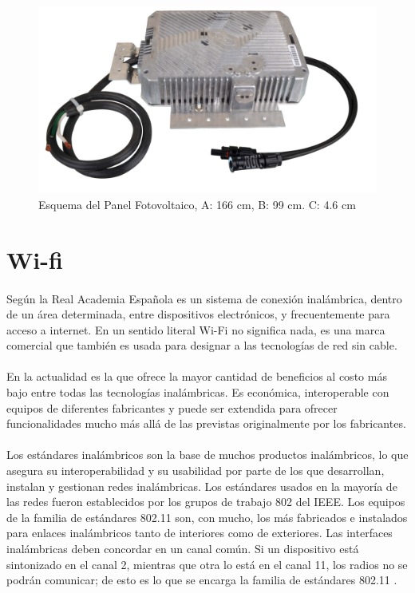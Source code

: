 \begin{figure}[H]
	\centering
	\includegraphics[scale=.25]{Capitulo2/images/microinversor.png}
	\caption{Esquema del Panel Fotovoltaico, A: 166 cm, B: 99 cm. C: 4.6 cm}
	\label{fig:diagrama_dispensador}
\end{figure}
 
 
 \section{Wi-fi}
 \paragraph{}
 Según la Real Academia Española es un sistema de conexión inalámbrica, dentro de un área determinada, entre dispositivos electrónicos, y frecuentemente para acceso a internet. En un sentido literal Wi-Fi no significa nada, es una marca comercial que también es usada para designar a las tecnologías de red sin cable.
 \paragraph{}
 En la actualidad es la que ofrece la mayor cantidad de beneficios al costo más bajo entre todas las tecnologías inalámbricas. Es económica, interoperable con equipos de diferentes fabricantes y puede ser extendida para ofrecer funcionalidades mucho más allá de las previstas originalmente por los fabricantes.
 \paragraph{}
 Los estándares inalámbricos son la base de muchos productos inalámbricos, lo que asegura su interoperabilidad y su usabilidad por parte de los que desarrollan, instalan y gestionan redes inalámbricas. Los estándares usados en la mayoría de las redes fueron establecidos por los grupos de trabajo 802 del IEEE. Los equipos de la familia de estándares 802.11 son, con mucho, los más fabricados e instalados para enlaces inalámbricos tanto de interiores como de exteriores. Las interfaces inalámbricas deben concordar en un canal común. Si un dispositivo está sintonizado en el canal 2, mientras que otra lo está en el canal 11, los radios no se podrán comunicar; de esto es lo que se encarga la familia de estándares 802.11 \citep{MarcoTeoricoWifi}.
